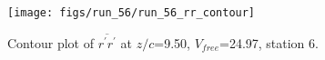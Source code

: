 \begin{figure}[H]
\centering
\texttt{[image: figs/run\_56/run\_56\_rr\_contour]}
\caption{Contour plot of $\overline{r^\prime r^\prime}$ at $z/c$=9.50, $V_{free}$=24.97, station 6.}
\label{fig:run_56_rr_contour}
\end{figure}


